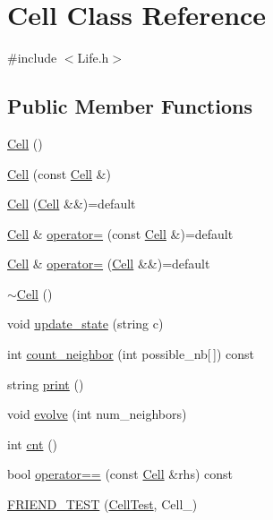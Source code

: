 \hypertarget{classCell}{\section{Cell Class Reference}
\label{classCell}
}


{\ttfamily \#include $<$Life.\-h$>$}

\subsection*{Public Member Functions}
\begin{DoxyCompactItemize}
\item 
\hyperlink{classCell_a394510643e8664cf12b5efaf5cb99f71}{Cell} ()
\item 
\hyperlink{classCell_a8ca000885181236a713963c5c8bdb46f}{Cell} (const \hyperlink{classCell}{Cell} \&)
\item 
\hyperlink{classCell_a07dc1c921001f28dfd83cc2511c913ed}{Cell} (\hyperlink{classCell}{Cell} \&\&)=default
\item 
\hyperlink{classCell}{Cell} \& \hyperlink{classCell_a45915eabf6c5940c10bc05112c16fb91}{operator=} (const \hyperlink{classCell}{Cell} \&)=default
\item 
\hyperlink{classCell}{Cell} \& \hyperlink{classCell_a87fc42eae25a2ef5e982804646108df8}{operator=} (\hyperlink{classCell}{Cell} \&\&)=default
\item 
\hyperlink{classCell_a9fa559f7a28e2b4336c6879ca09304d8}{$\sim$\-Cell} ()
\item 
void \hyperlink{classCell_ae33f6e56c2c45696eb2fa5ef3d431e79}{update\-\_\-state} (string c)
\item 
int \hyperlink{classCell_a16143f59210233e77fb2e883584f62d0}{count\-\_\-neighbor} (int possible\-\_\-nb\mbox{[}$\,$\mbox{]}) const 
\item 
string \hyperlink{classCell_a00ae4bdf312b9a5ba5b505b3ed9d7731}{print} ()
\item 
void \hyperlink{classCell_a7eb57e91d1244ef230efdaa1e4707007}{evolve} (int num\-\_\-neighbors)
\item 
int \hyperlink{classCell_a819661c780e31c3c0b69d084c1e06577}{cnt} ()
\item 
bool \hyperlink{classCell_a4c1ef917de3d6aae865d13ddb590a607}{operator==} (const \hyperlink{classCell}{Cell} \&rhs) const 
\item 
\hyperlink{classCell_a8c4981431d8778737227d412d953ced4}{F\-R\-I\-E\-N\-D\-\_\-\-T\-E\-S\-T} (\hyperlink{classCell_a4a8fb13b6ff304aefc7aa29538062941}{Cell\-Test}, Cell\-\_)

\end{DoxyCompactItemize}
